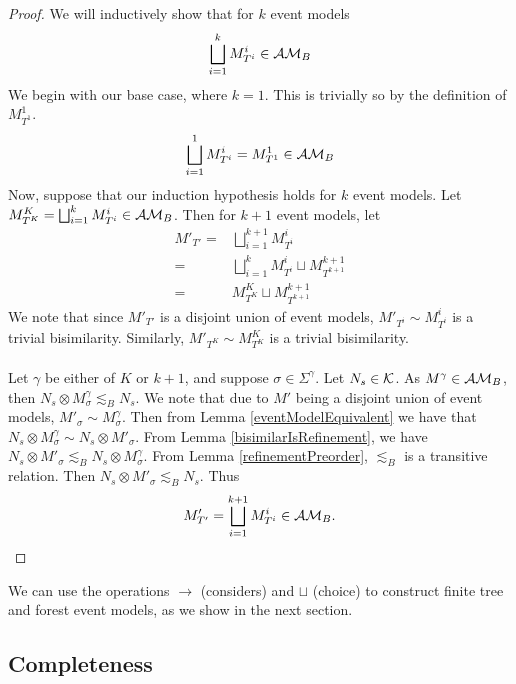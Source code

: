 \begin{proof}
We will inductively show that for $k$ event models
\[
	\bigsqcup_{i = 1}^k M^i_{T^i} \in \mathcal{AM}_B
\]
We begin with our base case, where $k = 1$.
This is trivially so by the definition of $M^1_{T^1}$.
\[
	\bigsqcup_{i = 1}^1 M^i_{T^i} = M^1_{T^1} \in \mathcal{AM}_B
\]
Now, suppose that our induction hypothesis holds for $k$ event models.
Let $M^K_{T^K} = \bigsqcup_{i = 1}^k M^i_{T^i} \in \mathcal{AM}_B$.
Then for $k+1$ event models, let
\begin{align*}
	M'_{T'} = & \bigsqcup_{i = 1}^{k+1} M^i_{T^i} \\
	= & \bigsqcup_{i = 1}^k M^i_{T^i} \sqcup M^{k+1}_{T^{k+1}} \\
	= & M^K_{T^K} \sqcup M^{k+1}_{T^{k+1}}
\end{align*}
We note that since $M'_{T'}$ is a disjoint union of event models, $M'_{T^i} \sim M^i_{T^i}$ is a
trivial bisimilarity.
Similarly, $M'_{T^K} \sim M^K_{T^K}$ is a trivial bisimilarity.\\
\\
Let $\gamma$ be either of $K$ or $k+1$, and suppose $\sigma \in \Sigma^\gamma$.
Let $N_s \in \mathcal{K}$.
As $M^\gamma \in \mathcal{AM}_B$, then $N_s \otimes M^\gamma_\sigma \lesssim_B N_s$.
We note that due to $M'$ being a disjoint union of event models, $M'_\sigma \sim M^\gamma_\sigma$.
Then from Lemma \ref{eventModelEquivalent} we have that $N_s \otimes M^\gamma_\sigma \sim N_s
\otimes M'_\sigma$.
From Lemma \ref{bisimilarIsRefinement}, we have $N_s \otimes M'_\sigma \lesssim_B N_s \otimes M^\gamma_\sigma$.
From Lemma \ref{refinementPreorder}, $\lesssim_B$ is a transitive relation.
Then $N_s \otimes M'_\sigma \lesssim_B N_s$.
Thus
\[
M'_{T'} = \bigsqcup_{i = 1}^{k+1} M^i_{T^i} \in \mathcal{AM}_B.
\]
\end{proof}

We can use the operations $\to$ (considers) and $\sqcup$ (choice) to construct finite tree and
forest event models, as we show in the next section.

\subsection{Completeness}


